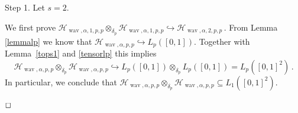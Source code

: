 \documentclass[12pt]{article}
\DeclareMathOperator{\wav}{wav}
\newenvironment{proof}{\begin{trivlist}
    \item[\hskip\labelsep{\it Proof.}]}{$\hfill\Box$\end{trivlist}}
\newcommand{\HH}{\mathcal{H}}
\newcommand{\red}[1]{\textcolor{red}{#1}}
\begin{document}
\begin{proof}[Proof of Theorem~\ref{tensor17}] 
Step 1. Let $s=2$.

We first prove $
  \HH_{\wav,\alpha,1,p,p} \otimes_{\delta_p}  \HH_{\wav,\alpha,1,p,p} \hookrightarrow
   \HH_{\wav,\alpha,2,p,p} \, .$
From Lemma \ref{lemmalp} we know that $\HH_{\wav,\alpha,p,p} \hookrightarrow L_p ([0,1])$.
Together with Lemma~\ref{tops1}
and \eqref{tensorlp} 
this implies  
\[
 \HH_{\wav,\alpha,p,p} \otimes_{\delta_p} \HH_{\wav,\alpha,p,p} \hookrightarrow 
 L_p ([0,1])\otimes_{\delta_p}  L_p ([0,1]) = L_p ([0,1]^2)\, .
\]
In particular, we conclude that 
$ \HH_{\wav,\alpha,p,p} \otimes_{\delta_p} \HH_{\wav,\alpha,p,p} %
\subseteq L_1 ([0,1]^2)$.
 

\end{proof}
\end{document}
